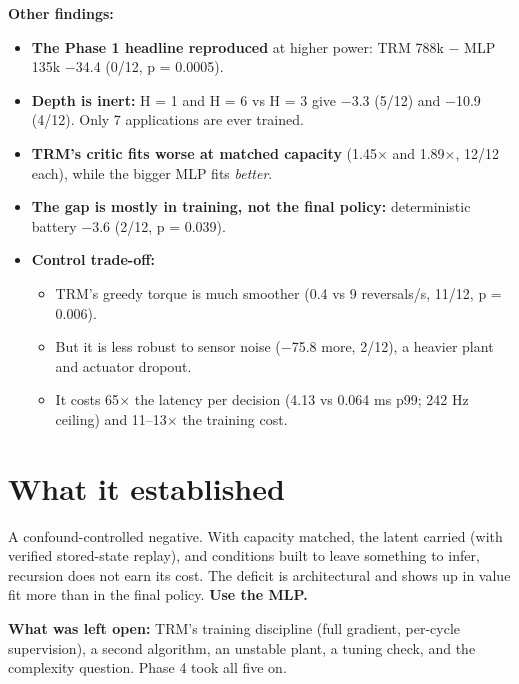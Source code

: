 \documentclass[11pt]{article}
\begin{document}
\textbf{Other findings:}

\begin{itemize}
\item \textbf{The Phase 1 headline reproduced} at higher power: TRM 788k $-$ MLP 135k $-$34.4 (0/12, p = 0.0005).
\item \textbf{Depth is inert:} H = 1 and H = 6 vs H = 3 give $-$3.3 (5/12) and $-$10.9 (4/12). Only 7 applications are ever trained.
\item \textbf{TRM's critic fits worse at matched capacity} (1.45$\times$ and 1.89$\times$, 12/12 each), while the bigger MLP fits \emph{better}.
\item \textbf{The gap is mostly in training, not the final policy:} deterministic battery $-$3.6 (2/12, p = 0.039).
\item \textbf{Control trade-off:}
\begin{itemize}
\item TRM's greedy torque is much smoother (0.4 vs 9 reversals/s, 11/12, p = 0.006).
\item But it is less robust to sensor noise ($-$75.8 more, 2/12), a heavier plant and actuator dropout.
\item It costs 65$\times$ the latency per decision (4.13 vs 0.064 ms p99; 242 Hz ceiling) and 11--13$\times$ the training cost.
\end{itemize}
\end{itemize}



\section*{What it established}



A confound-controlled negative. With capacity matched, the latent carried (with verified stored-state replay), and conditions built to leave something to infer, recursion does not earn its cost. The deficit is architectural and shows up in value fit more than in the final policy. \textbf{Use the MLP.}



\textbf{What was left open:} TRM's training discipline (full gradient, per-cycle supervision), a second algorithm, an unstable plant, a tuning check, and the complexity question. Phase 4 took all five on.
\end{document}
